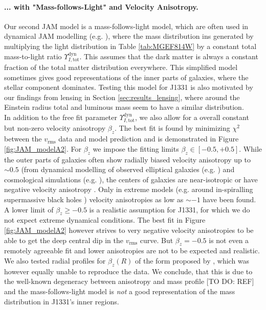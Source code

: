 \paragraph{... with "Mass-follows-Light" and Velocity Anisotropy.} Our second JAM model is a mass-follows-light model, which are often used in dynamical JAM modelling (e.g. \citet{GlennEC,Cap06}), where the mass distribution ins generated by multiplying the light distribution in Table \ref{tab:MGEF814W} by a constant total mass-to-light ratio  $\Upsilon_{I,\text{tot}}^\text{dyn}$. This assumes that the dark matter is always a constant fraction of the total matter distribution everywhere. This simplified model sometimes gives good representations of the inner parts of galaxies, where the stellar component dominates. Testing this model for J1331 is also motivated by our findings from lensing in Section \ref{sec:results_lensing}, where around the Einstein radius total and luminous mass seem to have a similar distribution.
\\In addition to the free fit parameter  $\Upsilon_{I,\text{tot}}^\text{dyn}$, we also allow for a overall constant but non-zero velocity anisotropy $\beta_z$. The best fit is found by minimizing $\chi^2$ between the $v_\text{rms}$ data and model prediction and is demonstrated in Figure \ref{fig:JAM_modelA2}. For $\beta_z$ we impose the fitting limits $\beta_z \in [-0.5,+0.5]$. While the outer parts of galaxies often show radially biased velocity anisotropy up to $\sim 0.5$ (from dynamical modelling of observed elliptical galaxies (e.g. \citet{Kronawitter2000}) and cosmological simulations (e.g. \citet{2004MNRAS.352..535D,2001ApJ...557..533F}), the centers of galaxies are near-isotropic or have  negative velocity anisotropy \citep{2003ApJ...583...92G}. Only in extreme models (e.g. around in-spiralling supermassive black holes \citep{1997NewA....2..533Q}) velocity anisotropies as low as $\sim -1$ have been found. A lower limit of $\beta_z \geq -0.5$ is a realistic assumption for J1331, for which we do not expect extreme dynamical conditions. The best fit in Figure \ref{fig:JAM_modelA2} however strives to very negative velocity anisotropies to be able to get the deep central dip in the  $v_\text{rms}$ curve. But $\beta_z = -0.5$ is not even a remotely agreeable fit and lower anisotropies are not to be expected and realistic. We also tested radial profiles for $\beta_z(R)$ of the form proposed by \citet{BaesVanHese}, which was however equally unable to reproduce the data. We conclude, that this is due to the well-known degeneracy between anisotropy and mass profile [TO DO: REF] and the mass-follows-light model is \emph{not} a good representation of the mass distribution in J1331's inner regions.



